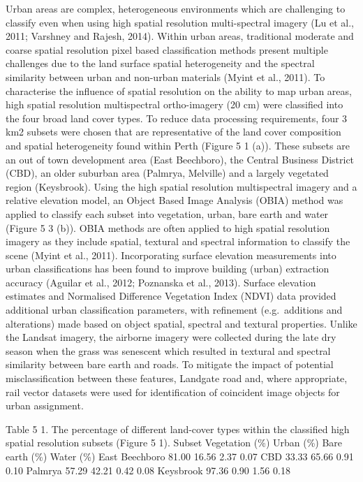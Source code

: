 \documentclass[]{book}
\begin{document}
Urban areas are complex, heterogeneous environments which are
challenging to classify even when using high spatial resolution
multi-spectral imagery (Lu et al., 2011; Varshney and Rajesh, 2014).
Within urban areas, traditional moderate and coarse spatial resolution
pixel based classification methods present multiple challenges due to
the land surface spatial heterogeneity and the spectral similarity
between urban and non-urban materials (Myint et al., 2011). To
characterise the influence of spatial resolution on the ability to map
urban areas, high spatial resolution multispectral ortho-imagery (20 cm)
were classified into the four broad land cover types. To reduce data
processing requirements, four 3 km2 subsets were chosen that are
representative of the land cover composition and spatial heterogeneity
found within Perth (Figure 5 1 (a)). These subsets are an out of town
development area (East Beechboro), the Central Business District (CBD),
an older suburban area (Palmrya, Melville) and a largely vegetated
region (Keysbrook). Using the high spatial resolution multispectral
imagery and a relative elevation model, an Object Based Image Analysis
(OBIA) method was applied to classify each subset into vegetation,
urban, bare earth and water (Figure 5 3 (b)). OBIA methods are often
applied to high spatial resolution imagery as they include spatial,
textural and spectral information to classify the scene (Myint et al.,
2011). Incorporating surface elevation measurements into urban
classifications has been found to improve building (urban) extraction
accuracy (Aguilar et al., 2012; Poznanska et al., 2013). Surface
elevation estimates and Normalised Difference Vegetation Index (NDVI)
data provided additional urban classification parameters, with
refinement (e.g.~additions and alterations) made based on object
spatial, spectral and textural properties. Unlike the Landsat imagery,
the airborne imagery were collected during the late dry season when the
grass was senescent which resulted in textural and spectral similarity
between bare earth and roads. To mitigate the impact of potential
misclassification between these features, Landgate road and, where
appropriate, rail vector datasets were used for identification of
coincident image objects for urban assignment.

Table 5 1. The percentage of different land-cover types within the
classified high spatial resolution subsets (Figure 5 1). Subset
Vegetation (\%) Urban (\%) Bare earth (\%) Water (\%) East Beechboro
81.00 16.56 2.37 0.07 CBD 33.33 65.66 0.91 0.10 Palmrya 57.29 42.21 0.42
0.08 Keysbrook 97.36 0.90 1.56 0.18
\end{document}
